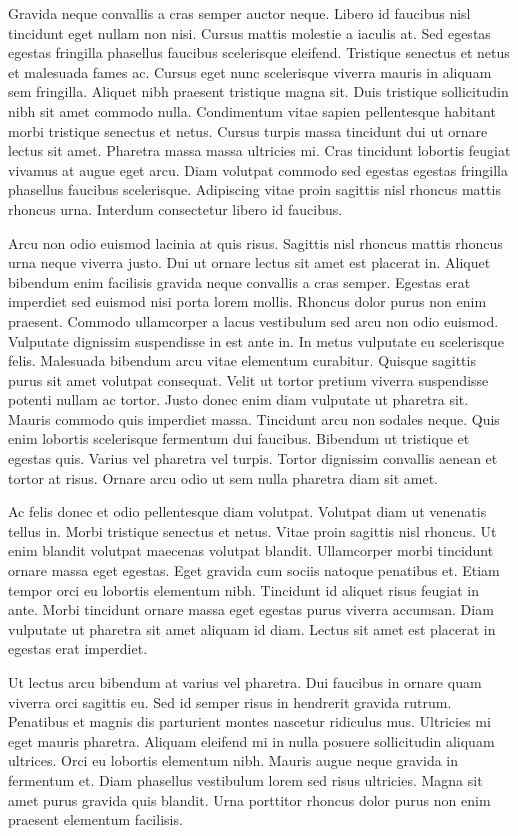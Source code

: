 \documentclass[11pt,a4paper]{article}
\begin{document}
Gravida neque convallis a cras semper auctor neque. Libero id faucibus nisl tincidunt eget nullam non nisi. Cursus mattis molestie a iaculis at. Sed egestas egestas fringilla phasellus faucibus scelerisque eleifend. Tristique senectus et netus et malesuada fames ac. Cursus eget nunc scelerisque viverra mauris in aliquam sem fringilla. Aliquet nibh praesent tristique magna sit. Duis tristique sollicitudin nibh sit amet commodo nulla. Condimentum vitae sapien pellentesque habitant morbi tristique senectus et netus. Cursus turpis massa tincidunt dui ut ornare lectus sit amet. Pharetra massa massa ultricies mi. Cras tincidunt lobortis feugiat vivamus at augue eget arcu. Diam volutpat commodo sed egestas egestas fringilla phasellus faucibus scelerisque. Adipiscing vitae proin sagittis nisl rhoncus mattis rhoncus urna. Interdum consectetur libero id faucibus.

Arcu non odio euismod lacinia at quis risus. Sagittis nisl rhoncus mattis rhoncus urna neque viverra justo. Dui ut ornare lectus sit amet est placerat in. Aliquet bibendum enim facilisis gravida neque convallis a cras semper. Egestas erat imperdiet sed euismod nisi porta lorem mollis. Rhoncus dolor purus non enim praesent. Commodo ullamcorper a lacus vestibulum sed arcu non odio euismod. Vulputate dignissim suspendisse in est ante in. In metus vulputate eu scelerisque felis. Malesuada bibendum arcu vitae elementum curabitur. Quisque sagittis purus sit amet volutpat consequat. Velit ut tortor pretium viverra suspendisse potenti nullam ac tortor. Justo donec enim diam vulputate ut pharetra sit. Mauris commodo quis imperdiet massa. Tincidunt arcu non sodales neque. Quis enim lobortis scelerisque fermentum dui faucibus. Bibendum ut tristique et egestas quis. Varius vel pharetra vel turpis. Tortor dignissim convallis aenean et tortor at risus. Ornare arcu odio ut sem nulla pharetra diam sit amet.

Ac felis donec et odio pellentesque diam volutpat. Volutpat diam ut venenatis tellus in. Morbi tristique senectus et netus. Vitae proin sagittis nisl rhoncus. Ut enim blandit volutpat maecenas volutpat blandit. Ullamcorper morbi tincidunt ornare massa eget egestas. Eget gravida cum sociis natoque penatibus et. Etiam tempor orci eu lobortis elementum nibh. Tincidunt id aliquet risus feugiat in ante. Morbi tincidunt ornare massa eget egestas purus viverra accumsan. Diam vulputate ut pharetra sit amet aliquam id diam. Lectus sit amet est placerat in egestas erat imperdiet.

Ut lectus arcu bibendum at varius vel pharetra. Dui faucibus in ornare quam viverra orci sagittis eu. Sed id semper risus in hendrerit gravida rutrum. Penatibus et magnis dis parturient montes nascetur ridiculus mus. Ultricies mi eget mauris pharetra. Aliquam eleifend mi in nulla posuere sollicitudin aliquam ultrices. Orci eu lobortis elementum nibh. Mauris augue neque gravida in fermentum et. Diam phasellus vestibulum lorem sed risus ultricies. Magna sit amet purus gravida quis blandit. Urna porttitor rhoncus dolor purus non enim praesent elementum facilisis.
\end{document}
